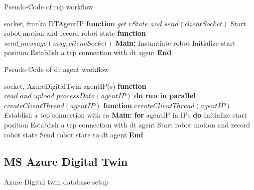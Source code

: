 \begin{breakablealgorithm}
    \caption{Pseudo-Code of \gls{rcp} workflow}
    \label{alg:RCPPseudoCode}
    \begin{algorithmic}
     socket, franka
     DTAgentIP
    \State \textbf{function} {$get\_rState\_and\_send(clientSocket)$}
        \State \qquad Start robot motion and record robot state
        \State {}
    \State \textbf{function} {$send\_message(msg, cliencSocket)$}
        \State \qquad 
    \State \textbf{Main:}
    \State \qquad Instantiate robot
    \State \qquad Initialize start position
    \State \qquad Establish a \gls{tcp} connection with \gls{dt} agent  
    \State {}
    \State \textbf{End}
    \end{algorithmic}
\end{breakablealgorithm}

\begin{breakablealgorithm}
    \caption{Pseudo-Code of \gls{dt} agent workflow}
    \label{alg:DTAgentPseudoCode}
    \begin{algorithmic}
     socket, AzureDigitalTwin
     agentIP(s)
    \State \textbf{function} {$read\_and\_upload\_processData(agentIP)$}
        \State \qquad \textbf{do run in parallel}
            \State \qquad \qquad $createClientThread(agentIP)$       
    \State \textbf{function} {$createClientThread(agentIP)$}
        \State \qquad Establish a \gls{tcp} connection with \gls{ra}
    \State \textbf{Main:}
        \State \qquad \textbf{for} agentIP in IPs \textbf{do}
        \State \qquad {}
        \State \qquad Initialize start position
        \State \qquad Establish a \gls{tcp} connection with \gls{dt} agent  
        \State \qquad Start robot motion and record robot state
        \State \qquad Send robot state to \gls{dt} agent 
        \State \textbf{End}
    \end{algorithmic}
\end{breakablealgorithm}



\subsection{MS Azure Digital Twin}
Azure Digital twin database setup